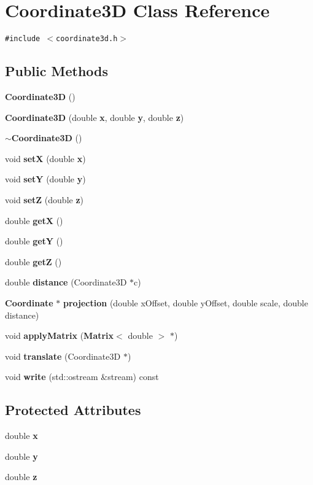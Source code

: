 \section{Coordinate3D Class Reference}
\label{classCoordinate3D}
{\tt \#include $<$coordinate3d.h$>$}

\subsection*{Public Methods}
\begin{CompactItemize}
\item 
{\bf Coordinate3D} ()
\item 
{\bf Coordinate3D} (double {\bf x}, double {\bf y}, double {\bf z})
\item 
{\bf $\sim$Coordinate3D} ()
\item 
void {\bf set\-X} (double {\bf x})
\item 
void {\bf set\-Y} (double {\bf y})
\item 
void {\bf set\-Z} (double {\bf z})
\item 
double {\bf get\-X} ()
\item 
double {\bf get\-Y} ()
\item 
double {\bf get\-Z} ()
\item 
double {\bf distance} (Coordinate3D $\ast$c)
\item 
{\bf Coordinate} $\ast$ {\bf projection} (double x\-Offset, double y\-Offset, double scale, double distance)
\item 
void {\bf apply\-Matrix} ({\bf Matrix}$<$ double $>$ $\ast$)
\item 
void {\bf translate} (Coordinate3D $\ast$)
\item 
void {\bf write} (std::ostream \&stream) const
\end{CompactItemize}
\subsection*{Protected Attributes}
\begin{CompactItemize}
\item 
double {\bf x}
\item 
double {\bf y}
\item 
double {\bf z}
\end{CompactItemize}


